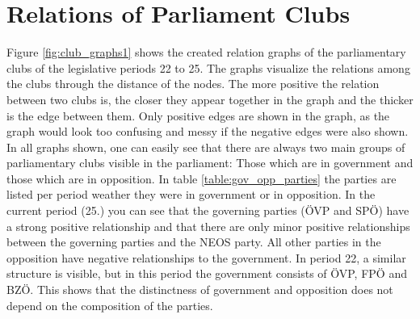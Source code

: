 \section{Relations of Parliament Clubs}
\label{sec:relations_clubs}
Figure \ref{fig:club_graphs1} shows the created relation graphs of the parliamentary clubs of the legislative periods 22 to 25. The graphs visualize the relations among the clubs through the distance of the nodes. The more positive the relation between two clubs is, the closer they appear together in the graph and the thicker is the edge between them. Only positive edges are shown in the graph, as the graph would look too confusing and messy if the negative edges were also shown. In all graphs shown, one can easily see that there are always two main groups of parliamentary clubs visible in the parliament: Those which are in government and those which are in opposition. In table \ref{table:gov_opp_parties} the parties are listed per period weather they were in government or in opposition. 
In the current period (25.) you can see that the governing parties (ÖVP and SPÖ) have a strong positive relationship and that there are only minor positive relationships between the governing parties and the NEOS party. All other parties in the opposition have negative relationships to the government. In period 22, a similar structure is visible, but in this period the government consists of ÖVP, FPÖ and BZÖ. This shows that the distinctness of government and opposition does not depend on the composition of the parties. 

